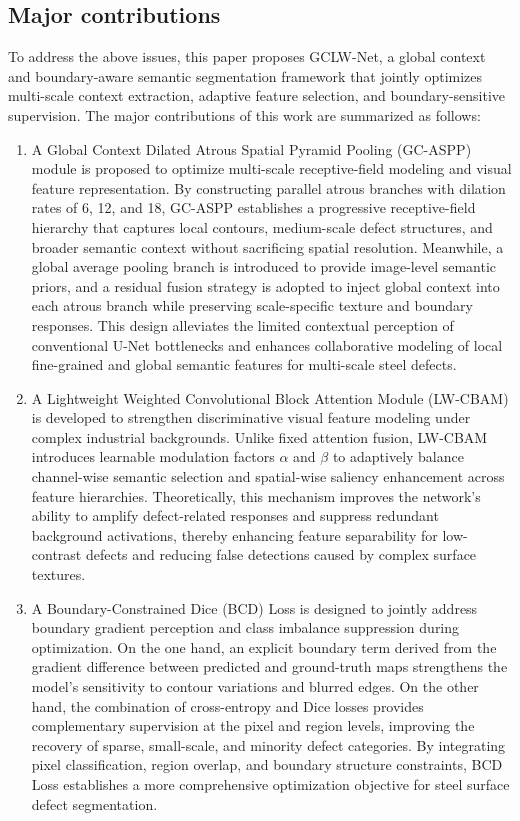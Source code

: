 \documentclass[sn-basic]{sn-jnl}
\theoremstyle{thmstyleone}%
\theoremstyle{thmstyletwo}%
\theoremstyle{thmstylethree}%
\begin{document}
\subsection{Major contributions}
To address the above issues, this paper proposes GCLW-Net, a global context and boundary-aware semantic segmentation framework that jointly optimizes multi-scale context extraction, adaptive feature selection, and boundary-sensitive supervision. The major contributions of this work are summarized as follows:
\begin{enumerate}
    \item A Global Context Dilated Atrous Spatial Pyramid Pooling (GC-ASPP) module is proposed to optimize multi-scale receptive-field modeling and visual feature representation. By constructing parallel atrous branches with dilation rates of 6, 12, and 18, GC-ASPP establishes a progressive receptive-field hierarchy that captures local contours, medium-scale defect structures, and broader semantic context without sacrificing spatial resolution. Meanwhile, a global average pooling branch is introduced to provide image-level semantic priors, and a residual fusion strategy is adopted to inject global context into each atrous branch while preserving scale-specific texture and boundary responses. This design alleviates the limited contextual perception of conventional U-Net bottlenecks and enhances collaborative modeling of local fine-grained and global semantic features for multi-scale steel defects.
    \item A Lightweight Weighted Convolutional Block Attention Module (LW-CBAM) is developed to strengthen discriminative visual feature modeling under complex industrial backgrounds. Unlike fixed attention fusion, LW-CBAM introduces learnable modulation factors $\alpha$ and $\beta$ to adaptively balance channel-wise semantic selection and spatial-wise saliency enhancement across feature hierarchies. Theoretically, this mechanism improves the network's ability to amplify defect-related responses and suppress redundant background activations, thereby enhancing feature separability for low-contrast defects and reducing false detections caused by complex surface textures.
    \item A Boundary-Constrained Dice (BCD) Loss is designed to jointly address boundary gradient perception and class imbalance suppression during optimization. On the one hand, an explicit boundary term derived from the gradient difference between predicted and ground-truth maps strengthens the model's sensitivity to contour variations and blurred edges. On the other hand, the combination of cross-entropy and Dice losses provides complementary supervision at the pixel and region levels, improving the recovery of sparse, small-scale, and minority defect categories. By integrating pixel classification, region overlap, and boundary structure constraints, BCD Loss establishes a more comprehensive optimization objective for steel surface defect segmentation.
\end{enumerate}
\end{document}
